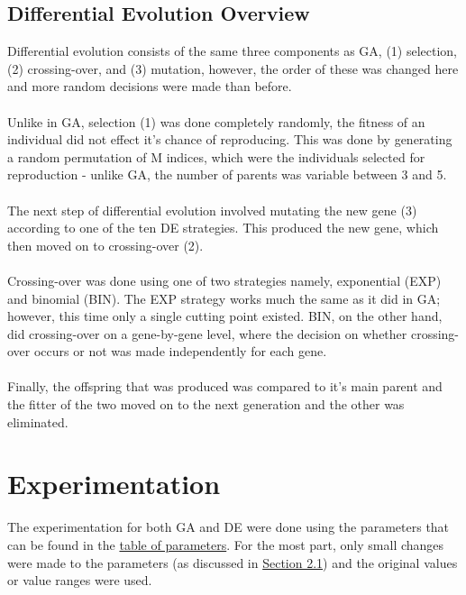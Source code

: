 \documentclass[paper=a4, fontsize=11pt]{scrartcl} %
\numberwithin{equation}{section} %
\numberwithin{figure}{section} %
\numberwithin{table}{section} %
\begin{document}
	\subsection{Differential Evolution Overview}\label{S12}
		Differential evolution consists of the same three components as GA, (1) selection, (2) crossing-over, and (3) mutation, however, the order of these was changed here and more random decisions were made than before.\\
		\\Unlike in GA, selection (1) was done completely randomly, the fitness of an individual did not effect it's chance of reproducing. This was done by generating a random permutation of M indices, which were the individuals selected for reproduction - unlike GA, the number of parents was variable between 3 and 5. \\
		\\The next step of differential evolution involved mutating the new gene (3) according to one of the ten DE strategies. This produced the new gene, which then moved on to crossing-over (2).\\
		\\Crossing-over was done using one of two strategies namely, exponential (EXP) and binomial (BIN). The EXP strategy works much the same as it did in GA; however, this time only a single cutting point existed. BIN, on the other hand, did crossing-over on a gene-by-gene level, where the decision on whether crossing-over occurs or not was made independently for each gene.\\
		\\Finally, the offspring that was produced was compared to it's main parent and the fitter of the two moved on to the next generation and the other was eliminated. 
	
			
\section{Experimentation}\label{S2}
	The experimentation for both GA and DE were done using the parameters that can be found in the \hyperref[T21]{table of parameters}. For the most part, only small changes were made to the parameters (as discussed in \hyperref[S21]{Section 2.1}) and the original values or value ranges were used.
	
\end{document}

